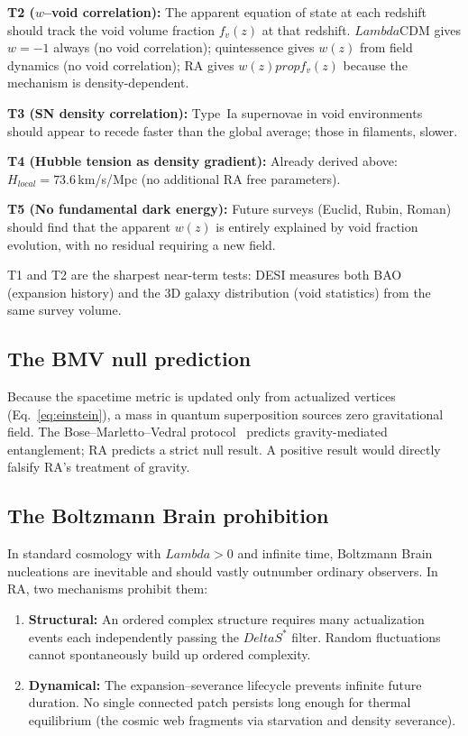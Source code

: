 \documentclass[11pt]{article}
\def\Delta{Delta}%
\def\Lambda{Lambda}%
\def\mathrm#1{#1}%
\def\propto{prop}%
\begin{document}
\textbf{T2 ($w$--void correlation):} The apparent equation of state at each redshift should track the void volume fraction $f_v(z)$ at that redshift. $\Lambda$CDM gives $w=-1$ always (no void correlation); quintessence gives $w(z)$ from field dynamics (no void correlation); RA gives $w(z)\propto f_v(z)$ because the mechanism is density-dependent.

\textbf{T3 (SN density correlation):} Type~Ia supernovae in void environments should appear to recede faster than the global average; those in filaments, slower.

\textbf{T4 (Hubble tension as density gradient):} Already derived above: $H_{\mathrm{local}}=73.6$\,km/s/Mpc (no additional RA free parameters).

\textbf{T5 (No fundamental dark energy):} Future surveys (Euclid, Rubin, Roman) should find that the apparent $w(z)$ is entirely explained by void fraction evolution, with no residual requiring a new field.

T1 and T2 are the sharpest near-term tests: DESI measures both BAO (expansion history) and the 3D galaxy distribution (void statistics) from the same survey volume.

\subsection{The BMV null prediction}

Because the spacetime metric is updated only from actualized vertices (Eq.~\ref{eq:einstein}), a mass in quantum superposition sources zero gravitational field. The Bose--Marletto--Vedral protocol~\cite{Bose2017, Marletto2017} predicts gravity-mediated entanglement; RA predicts a strict null result. A positive result would directly falsify RA's treatment of gravity.

\subsection{The Boltzmann Brain prohibition}

In standard cosmology with $\Lambda>0$ and infinite time, Boltzmann Brain nucleations are inevitable and should vastly outnumber ordinary observers. In RA, two mechanisms prohibit them:
\begin{enumerate}
\item \textbf{Structural:} An ordered complex structure requires many actualization events each independently passing the $\Delta S^*$ filter. Random fluctuations cannot spontaneously build up ordered complexity.
\item \textbf{Dynamical:} The expansion--severance lifecycle prevents infinite future duration. No single connected patch persists long enough for thermal equilibrium (the cosmic web fragments via starvation and density severance).
\end{enumerate}
\end{document}
